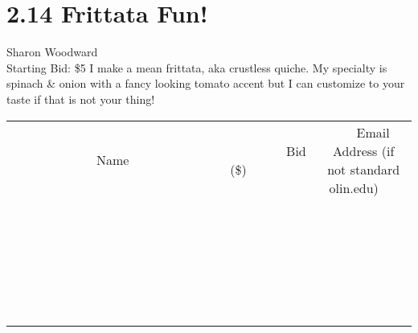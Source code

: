 \documentclass[11pt]{article}
\begin{document}
\section*{2.14 Frittata Fun!}
Sharon Woodward
\\
Starting Bid: \$5
\newline
I make a mean frittata, aka crustless quiche. My specialty is spinach \& onion with a fancy looking tomato accent but I can customize to your taste if that is not your thing!
\\[6ex]
\begin{tabular}{c c c}
~~~~~~~~~~~~~Name~~~~~~~~~~~~~ & ~~~~~~~~~Bid (\$)~~~~~~~~~  & ~~~Email Address (if not standard olin.edu)~~~\\
 & & \\
\hline
 & & \\
\hline
 & & \\
\hline
 & & \\
\hline
 & & \\
\hline
 & & \\
\hline
 & & \\
\hline
 & & \\
\hline
 & & \\
\hline
 & & \\
\hline
 & & \\
\hline
 & & \\
\hline
 & & \\
\hline
 & & \\
\hline
 & & \\
\hline
 & & \\
\hline
 & & \\
\hline
 & & \\
\hline
 & & \\
\hline
 & & \\
\hline
 & & \\
\hline
 & & \\
\hline
 & & \\
\hline
 & & \\
\hline
 & & \\
\hline
 & & \\
\hline
\end{tabular}
\newpage
\end{document}
